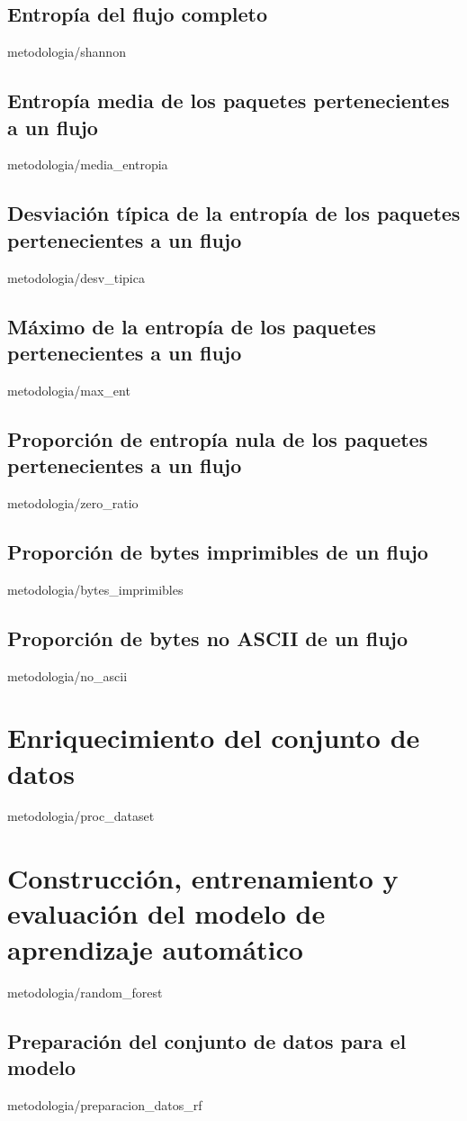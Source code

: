 \documentclass[epsbased,copyright,final,printable,covers,extendedindex,firstnumbered,tfg,gnuplot]{tfgtfmthesisuam}
\begin{document}
    \subsection{Entropía del flujo completo\label{SS:SHANNON}}{metodologia/shannon}
    \subsection{Entropía media de los paquetes pertenecientes a un flujo\label{SS:ENTROPIA_MEDIA}}{metodologia/media_entropia}
    \subsection{Desviación típica de la entropía de los paquetes pertenecientes a un flujo\label{SS:DESV_TIP_PAQ}}{metodologia/desv_tipica}
    \subsection{Máximo de la entropía de los paquetes pertenecientes a un flujo\label{SS:MAX_ENT}}{metodologia/max_ent}
    \subsection{Proporción de entropía nula de los paquetes pertenecientes a un flujo\label{SS:ENT_0_RATIO}}{metodologia/zero_ratio}
    \subsection{Proporción de bytes imprimibles de un flujo\label{SS:PRINT_RATIO}}{metodologia/bytes_imprimibles}
    \subsection{Proporción de bytes no ASCII de un flujo\label{SS:NO_ASCII}}{metodologia/no_ascii}
  \section{Enriquecimiento del conjunto de datos\label{SEC:PROC_DATASET}}{metodologia/proc_dataset}
  \section{Construcción, entrenamiento y evaluación del modelo de aprendizaje automático\label{SEC:RF}}{metodologia/random_forest}
    \subsection{Preparación del conjunto de datos para el modelo\label{SS:DATOS_RF}}{metodologia/preparacion_datos_rf}
\end{document}
